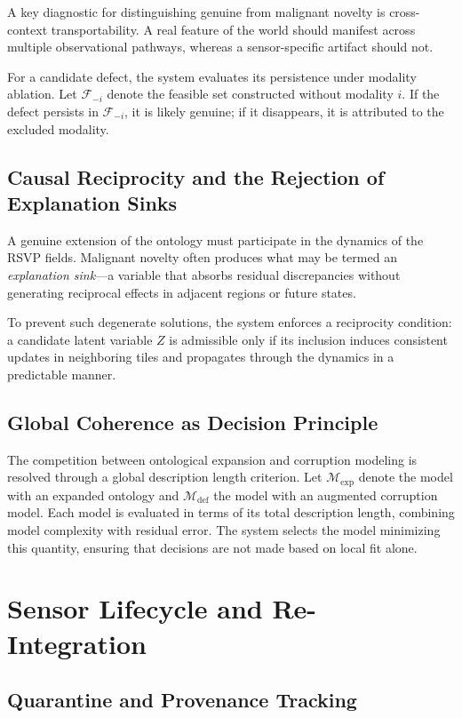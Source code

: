\documentclass[12pt, oneside]{article}
\begin{document}
A key diagnostic for distinguishing genuine from malignant novelty is cross-context transportability. A real feature of the world should manifest across multiple observational pathways, whereas a sensor-specific artifact should not.

For a candidate defect, the system evaluates its persistence under modality ablation. Let $\mathcal{F}_{-i}$ denote the feasible set constructed without modality $i$. If the defect persists in $\mathcal{F}_{-i}$, it is likely genuine; if it disappears, it is attributed to the excluded modality.

\subsection{Causal Reciprocity and the Rejection of Explanation Sinks}

A genuine extension of the ontology must participate in the dynamics of the RSVP fields. Malignant novelty often produces what may be termed an \emph{explanation sink}---a variable that absorbs residual discrepancies without generating reciprocal effects in adjacent regions or future states.

To prevent such degenerate solutions, the system enforces a reciprocity condition: a candidate latent variable $Z$ is admissible only if its inclusion induces consistent updates in neighboring tiles and propagates through the dynamics in a predictable manner.

\subsection{Global Coherence as Decision Principle}

The competition between ontological expansion and corruption modeling is resolved through a global description length criterion. Let $\mathcal{M}_{\text{exp}}$ denote the model with an expanded ontology and $\mathcal{M}_{\text{def}}$ the model with an augmented corruption model. Each model is evaluated in terms of its total description length, combining model complexity with residual error. The system selects the model minimizing this quantity, ensuring that decisions are not made based on local fit alone.

\section{Sensor Lifecycle and Re-Integration}

\subsection{Quarantine and Provenance Tracking}
\end{document}
